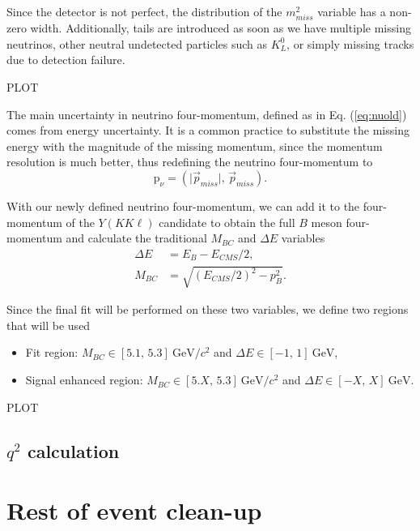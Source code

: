 \documentclass[oneside,a4paper,openany,12pt]{scrbook}
\newcommand {\e}[1]{\mathrm{~#1}}
\begin{document}
Since the detector is not perfect, the distribution of the $m_{miss}^2$ variable has a non-zero width. Additionally, tails are introduced as soon as we have multiple missing neutrinos, other neutral undetected particles such as $K_L^0$, or simply missing tracks due to detection failure.

\begin{center}
PLOT
\end{center}

The main uncertainty in neutrino four-momentum, defined as in Eq. (\ref{eq:nuold}) comes from energy uncertainty. It is a common practice to substitute the missing energy with the magnitude of the missing momentum, since the momentum resolution is much better, thus redefining the neutrino four-momentum to
\begin{equation}
\label{eq:nunew}
\mathrm{p}_\nu = \left(\vert \vec{p}_{miss} \vert,\,\vec{p}_{miss} \right).
\end{equation}

With our newly defined neutrino four-momentum, we can add it to the four-momentum of the $Y(KK\ell)$ candidate to obtain the full $B$ meson four-momentum and calculate the traditional $M_{BC}$ and $\Delta E$ variables
\begin{align}
\Delta E &= E_B - E_{CMS}/2,\\
M_{BC} &= \sqrt{\left(E_{CMS}/2\right)^2 - p_B^2}.
\end{align}

Since the final fit will be performed on these two variables, we define two regions that will be used
\begin{itemize}
\item Fit region: $M_{BC} \in [5.1,\,5.3]\e{GeV}/c^2$ and $\Delta E \in [-1,\,1]\e{GeV}$,
\item Signal enhanced region: $M_{BC} \in [5.X,\,5.3]\e{GeV}/c^2$ and $\Delta E \in [-X,\,X]\e{GeV}$.
\end{itemize}

\begin{center}
PLOT
\end{center}

\section{$q^2$ calculation}

\chapter{Rest of event clean-up}
\end{document}
